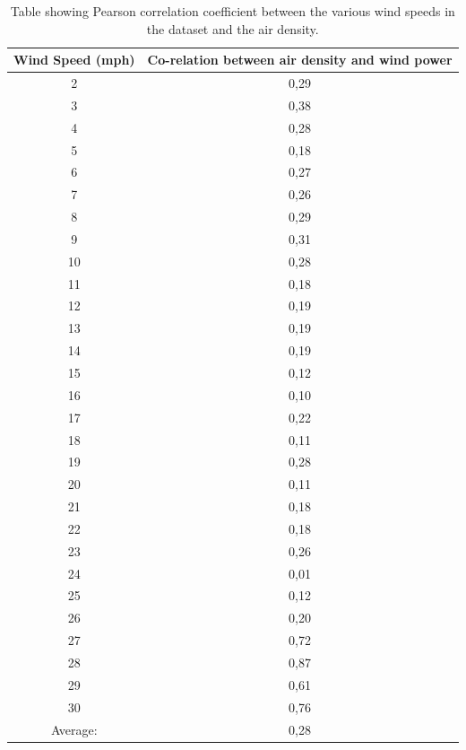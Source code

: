 \footnotesize
\begin{table}[H]
\centering  %
\begin{tabular}{|c|c|} %
\hline
Wind Speed (mph) & Co-relation between air density and wind power \\ %
\hline                  %
2 & 0,29\\ \hline
3 & 0,38 \\ \hline
4 & 0,28 \\ \hline
5 & 0,18 \\ \hline
6 & 0,27 \\ \hline
7 & 0,26 \\ \hline
8 & 0,29 \\ \hline
9 & 0,31 \\ \hline
10 & 0,28  \\ \hline
11 & 0,18 \\ \hline
12 & 0,19 \\ \hline
13 & 0,19 \\ \hline
14 & 0,19 \\ \hline
15 & 0,12 \\ \hline
16 & 0,10 \\ \hline
17 & 0,22 \\ \hline
18 & 0,11 \\ \hline
19 & 0,28 \\ \hline
20 & 0,11 \\ \hline
21 & 0,18 \\ \hline
22 & 0,18 \\ \hline
23 & 0,26 \\ \hline
24 & 0,01 \\ \hline
25 & 0,12 \\ \hline
26 & 0,20 \\ \hline
27 & 0,72 \\ \hline
28 & 0,87 \\ \hline
29 & 0,61 \\ \hline
30 & 0,76 \\ \hline  
Average: & 0,28 \\ %
\hline %
\end{tabular}
\caption{Table showing Pearson correlation coefficient between the various wind speeds in the dataset and the air density.} %
\label{table:pearsonCoeficientAirDensity} %
\end{table}
\normalsize

